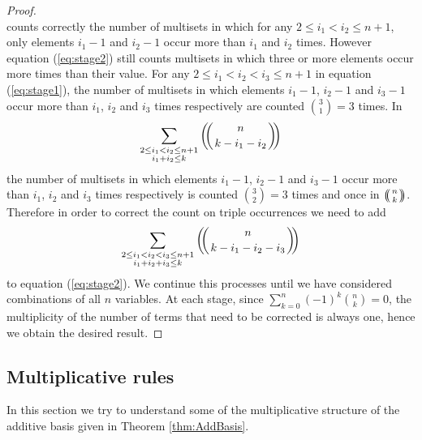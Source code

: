 \documentclass{article}
\theoremstyle{plain}
\theoremstyle{definition}
\numberwithin{thm}{section}
\begin{document}
\begin{proof}
\begin{equation}
				\end{equation}
				counts correctly the number of multisets in which for any $2\leq i_1<i_2 \leq n+1$, only elements $i_1-1$ and $i_2-1$ occur more than $i_1$ and $i_2$ times.
				However equation (\ref{eq:stage2}) still counts multisets in which three or more elements occur more times than their value.
				For any $2\leq i_1<i_2<i_3 \leq n+1$ in equation (\ref{eq:stage1}), the number of multisets in which elements $i_1-1$, $i_2-1$ and $i_3-1$
				occur more than $i_1$, $i_2$ and $i_3$ times respectively are counted $\binom{3}{1}=3$ times.
				In
				\begin{equation*}
					\sum_{\substack{2\leq i_1<i_2 \leq n+1 \\ i_1+i_2\leq k}}{{\ensuremath{\left(\kern-.3em\left(\genfrac{}{}{0pt}{}{{n}}{{k-i_1-i_2}}\right)\kern-.3em\right)}}}
				\end{equation*}
				the number of multisets in which elements $i_1-1$, $i_2-1$ and $i_3-1$
				occur more than $i_1$, $i_2$ and $i_3$ times respectively is counted $\binom{3}{2}=3$ times and once in ${\ensuremath{\left(\kern-.3em\left(\genfrac{}{}{0pt}{}{{n}}{{k}}\right)\kern-.3em\right)}}$.
				Therefore in order to correct the count on triple occurrences we need to add
				\begin{equation*}
					\sum_{\substack{2\leq i_1<i_2<i_3 \leq n+1 \\ i_1+i_2+i_3\leq k}}{{\ensuremath{\left(\kern-.3em\left(\genfrac{}{}{0pt}{}{{n}}{{k-i_1-i_2-i_3}}\right)\kern-.3em\right)}}}
				\end{equation*}
				to equation (\ref{eq:stage2}).
				We continue this processes until we have considered combinations of all $n$ variables.
				At each stage, since $\sum_{k=0}^{n}{(-1)^k\binom{n}{k}}=0$, the multiplicity of the number of terms that need to be corrected is always one,
				hence we obtain the desired result.
			\end{proof}
			
			
			
		\subsection{Multiplicative rules}\label{subsec:MultRule}
			
			In this section we try to understand some of the multiplicative structure of the additive basis given in Theorem \ref{thm:AddBasis}. 
			
\end{document}
